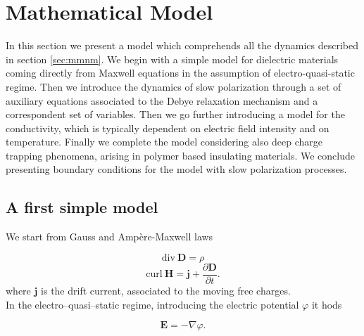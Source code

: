 \documentclass[11pt,a4paper]{article}
\begin{document}
\section{Mathematical Model}\label{sec:mat-model}
In this section we present a model which comprehends all the dynamics described in section \ref{sec:mmnm}. We begin with a simple model for dielectric materials coming directly from Maxwell equations in the assumption of electro-quasi-static regime. Then we introduce the dynamics of slow polarization through a set of auxiliary equations associated to the Debye relaxation mechanism and a correspondent set of variables. Then we go further introducing a model for the conductivity, which is typically dependent on electric field intensity and on temperature. Finally we complete the model considering also deep charge trapping phenomena, arising in polymer based insulating materials. We conclude presenting boundary conditions for the model with slow polarization processes.
\subsection{A first simple model}
We start from Gauss and Ampère-Maxwell laws

\begin{equation}
	\mathrm{div}\  \mathbf{D}  = \rho 
	\label{eq:Maxwell1}
\end{equation}
\begin{equation}
	\mathrm{curl}\ \mathbf{H} = \mathbf{j} + \dfrac{\partial \mathbf{D}}{\partial t}.
	\label{eq:Maxwell2}
\end{equation}
where \(\mathbf{j}\) is the drift current, associated to the moving free charges.\\
In the electro--quasi--static regime, introducing the electric potential \(\varphi\) it hods

\begin{equation} 
	\mathbf{E} = - \nabla \varphi.
	\label{eq:Epotential}
\end{equation}
\end{document}
